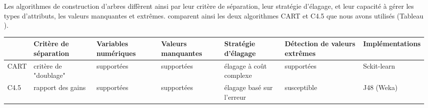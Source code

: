 Les algorithmes de construction d'arbres diffèrent ainsi par leur critère de séparation, leur stratégie d'élagage, et leur capacité à gérer les types d'attributs, les valeurs manquantes et extrêmes. \citet{singh2014id3cartc45} comparent ainsi les deux algorithmes CART et C4.5 que nous avons utilisés (Tableau ).

\begin{table}
	\begin{tabular}{|l|p{1.5cm}|p{1.5cm}|p{1.5cm}|p{1.5cm}|p{1.5cm}|p{1.5cm}|}
		\hline
		& Critère de séparation & Variables numériques & Valeurs manquantes & Stratégie d'élagage & Détection de valeurs extrêmes & Implémentations \\ \hline
CART   & critère de "doublage" & supportées & supportées & élagage à coût complexe & supportées  & Sckit-learn \\ \hline
C4.5 & rapport des gains & supportées & supportées & élagage basé sur l'erreur & susceptible & J48 (Weka) \\ \hline
	\end{tabular}
\end{table}

